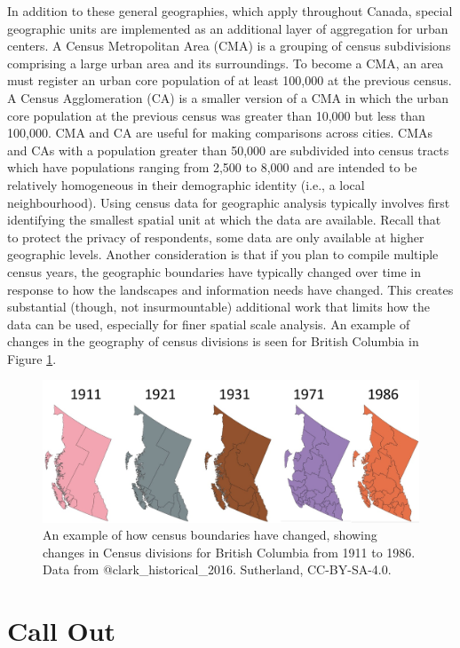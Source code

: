 \documentclass[
]{book}
\begin{document}
In addition to these general geographies, which apply throughout Canada, special geographic units are implemented as an additional layer of aggregation for urban centers. A Census Metropolitan Area (CMA) is a grouping of census subdivisions comprising a large urban area and its surroundings. To become a CMA, an area must register an urban core population of at least 100,000 at the previous census. A Census Agglomeration (CA) is a smaller version of a CMA in which the urban core population at the previous census was greater than 10,000 but less than 100,000. CMA and CA are useful for making comparisons across cities. CMAs and CAs with a population greater than 50,000 are subdivided into census tracts which have populations ranging from 2,500 to 8,000 and are intended to be relatively homogeneous in their demographic identity (i.e., a local neighbourhood).
Using census data for geographic analysis typically involves first identifying the smallest spatial unit at which the data are available. Recall that to protect the privacy of respondents, some data are only available at higher geographic levels. Another consideration is that if you plan to compile multiple census years, the geographic boundaries have typically changed over time in response to how the landscapes and information needs have changed. This creates substantial (though, not insurmountable) additional work that limits how the data can be used, especially for finer spatial scale analysis. An example of changes in the geography of census divisions is seen for British Columbia in Figure \ref{fig:4-shifting-census-boundaries}.

\begin{figure}
\includegraphics[width=0.75\linewidth]{images/04-shifting-census-boundaries} \caption{An example of how census boundaries have changed, showing changes in Census divisions for British Columbia from 1911 to 1986. Data from @clark_historical_2016. Sutherland, CC-BY-SA-4.0.}\label{fig:4-shifting-census-boundaries}
\end{figure}

\hypertarget{call-out}{%
\section*{Call Out}\label{call-out}}
\end{document}
